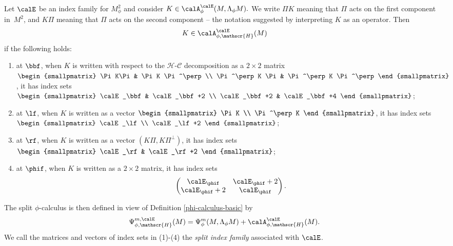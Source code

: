 \begin{defn} \label{def:split phi calc}
Let $\calE$ be an index family for $M^2_\phi$ and consider
$
K\in \calA^\calE_\phi(M,\Lambda_\phi M).
$
We write $\Pi K$ meaning that $\Pi$ acts on the first component in~$M^2$,
and $K\Pi$ meaning that $\Pi$ acts on the second component -- the notation suggested by
interpreting $K$ as an operator. Then
\[
K \in \calA^\calE_{\phi,\mathscr{H}}(M)
\]
if the following holds:
\begin{enumerate}
\item
at $\bbf$, when $K$ is written with respect to the $\mathscr{H}$-$\mathscr{C}$ decomposition as a $2\times2$ matrix $
\begin{smallpmatrix}
\Pi K\Pi & \Pi K \Pi^\perp \\ \Pi^\perp K \Pi & \Pi^\perp K \Pi^\perp
\end{smallpmatrix}
$, it has index sets
$\begin{smallpmatrix}
\calE_\bbf & \calE_\bbf+2 \\ \calE_\bbf+2 & \calE_\bbf+4
\end{smallpmatrix}
$;
\item
at $\lf$, when $K$ is written as a vector $
\begin{smallpmatrix}
\Pi K \\ \Pi^\perp K
\end{smallpmatrix}
$, it has index sets
$
\begin{smallpmatrix}
\calE_\lf \\ \calE_\lf+2
\end{smallpmatrix}
$;
\item
at $\rf$, when $K$ is written as a vector $(K\Pi,K\Pi^\perp)$, it has index sets
$
\begin{smallpmatrix}
\calE_\rf & \calE_\rf+2
\end{smallpmatrix}
$;
\item
at $\phif$, when $K$ is written as a $2\times 2$ matrix, it has index sets
\[
\begin{pmatrix}
\calE_\phif & \calE_\phif+2 \\ \calE_\phif+2 & \calE_\phif
\end{pmatrix}.
\]
\end{enumerate}
The split $\phi$-calculus is then defined in view of Definition \ref{phi-calculus-basic} by
\[
\Psi^{m,\calE}_{\phi, \mathscr{H}}(M) = \Psi^{m}_\phi(M, \Lambda_\phi M) + \calA^\calE_{\phi,\mathscr{H}}(M).
\]
We call the matrices and vectors of index sets in (1)-(4) the \textit{split index family} associated with $\calE$.
\end{defn}

